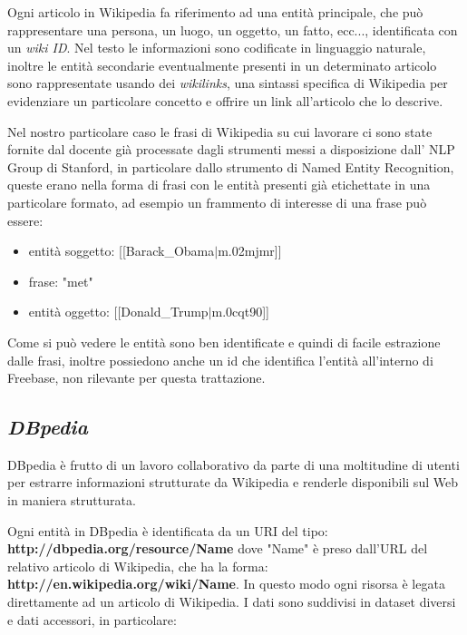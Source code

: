 \documentclass[10pt,a4paper,twocolumn]{article}
\begin{document}
Ogni articolo in Wikipedia fa riferimento ad una entità principale, che può rappresentare una persona, un luogo, un oggetto, un fatto, ecc..., identificata con un \textit{wiki ID}. Nel testo le informazioni sono codificate in linguaggio naturale, inoltre le entità secondarie eventualmente presenti in un determinato articolo sono rappresentate usando dei \textit{wikilinks}, una sintassi specifica di Wikipedia per evidenziare un particolare concetto e offrire un link all'articolo che lo descrive.

Nel nostro particolare caso le frasi di Wikipedia su cui lavorare ci sono state fornite dal docente già processate dagli strumenti messi a disposizione dall' NLP Group di Stanford, in particolare dallo strumento di Named Entity Recognition, queste erano nella forma di frasi con le entità presenti già etichettate in una particolare formato, ad esempio un frammento di interesse di una frase può essere:

\begin{itemize}
	\item entità soggetto: [[Barack\_Obama$|$m.02mjmr]]
	\item frase: "met"
	\item entità oggetto: [[Donald\_Trump$|$m.0cqt90]]
\end{itemize}

Come si può vedere le entità sono ben identificate e quindi di facile estrazione dalle frasi, inoltre possiedono anche un id che identifica l'entità all'interno di Freebase, non rilevante per questa trattazione.

\subsection*{\textit{DBpedia}}

DBpedia è frutto di un lavoro collaborativo da parte di una moltitudine di utenti per estrarre informazioni strutturate da Wikipedia e renderle disponibili sul Web in maniera strutturata.

Ogni entità in DBpedia è identificata da un URI del tipo:
\bigbreak
\textbf{http://dbpedia.org/resource/Name}
\bigbreak
dove "Name" è preso dall'URL del relativo articolo di Wikipedia, che ha la forma:
\bigbreak
\textbf{http://en.wikipedia.org/wiki/Name}.
\bigbreak
In questo modo ogni risorsa è legata direttamente ad un articolo di Wikipedia. I dati sono suddivisi in dataset diversi e dati accessori, in particolare:
\end{document}
